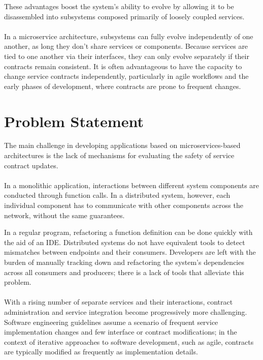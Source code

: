 These advantages boost the system's ability to evolve by allowing it to be disassembled into subsystems composed primarily of loosely coupled services.

\paragraph{}

In a microservice architecture, subsystems can fully evolve independently of one another, as long they don't share services or components.
Because services are tied to one another via their interfaces, they can only evolve separately if their contracts remain consistent.
It is often advantageous to have the capacity to change service contracts independently,
particularly in agile workflows and the early phases of development, where contracts are prone to frequent changes.

\section{Problem Statement} %
\label{sec:problem_statement}

The main challenge in developing applications based on microservices-based architectures is the lack of mechanisms for evaluating the safety of service contract updates.

\paragraph{}

In a monolithic application, interactions between different system components are conducted through function calls.
In a distributed system, however, each individual component has to communicate with other components across the network,
without the same guarantees.

In a regular program, refactoring a function definition can be done quickly with the aid of an IDE.
Distributed systems do not have equivalent tools to detect mismatches between endpoints and their consumers.
Developers are left with the burden of manually tracking down and refactoring the system's dependencies across all consumers and producers;
there is a lack of tools that alleviate this problem.

\paragraph{}

With a rising number of separate services and their interactions, contract administration and service integration become progressively more challenging.
Software engineering guidelines assume a scenario of frequent service implementation changes and few interface or contract modifications;
in the context of iterative approaches to software development, such as agile, contracts are typically modified as frequently as implementation details.

